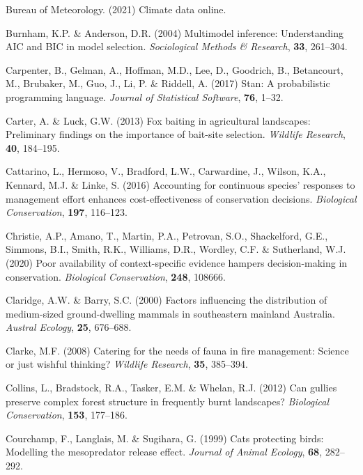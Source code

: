 \documentclass[]{elsarticle} %
\begin{document}
\leavevmode\hypertarget{ref-BOM2021}{}%
Bureau of Meteorology. (2021) Climate data online.

\leavevmode\hypertarget{ref-burnham2004multimodel}{}%
Burnham, K.P. \& Anderson, D.R. (2004) Multimodel inference: Understanding AIC and BIC in model selection. \emph{Sociological Methods \& Research}, \textbf{33}, 261--304.

\leavevmode\hypertarget{ref-carpenter2017stan}{}%
Carpenter, B., Gelman, A., Hoffman, M.D., Lee, D., Goodrich, B., Betancourt, M., Brubaker, M., Guo, J., Li, P. \& Riddell, A. (2017) Stan: A probabilistic programming language. \emph{Journal of Statistical Software}, \textbf{76}, 1--32.

\leavevmode\hypertarget{ref-carter2013fox}{}%
Carter, A. \& Luck, G.W. (2013) Fox baiting in agricultural landscapes: Preliminary findings on the importance of bait-site selection. \emph{Wildlife Research}, \textbf{40}, 184--195.

\leavevmode\hypertarget{ref-cattarino2016accounting}{}%
Cattarino, L., Hermoso, V., Bradford, L.W., Carwardine, J., Wilson, K.A., Kennard, M.J. \& Linke, S. (2016) Accounting for continuous species' responses to management effort enhances cost-effectiveness of conservation decisions. \emph{Biological Conservation}, \textbf{197}, 116--123.

\leavevmode\hypertarget{ref-christie2020poor}{}%
Christie, A.P., Amano, T., Martin, P.A., Petrovan, S.O., Shackelford, G.E., Simmons, B.I., Smith, R.K., Williams, D.R., Wordley, C.F. \& Sutherland, W.J. (2020) Poor availability of context-specific evidence hampers decision-making in conservation. \emph{Biological Conservation}, \textbf{248}, 108666.

\leavevmode\hypertarget{ref-claridge2000factors}{}%
Claridge, A.W. \& Barry, S.C. (2000) Factors influencing the distribution of medium-sized ground-dwelling mammals in southeastern mainland Australia. \emph{Austral Ecology}, \textbf{25}, 676--688.

\leavevmode\hypertarget{ref-clarke2008catering}{}%
Clarke, M.F. (2008) Catering for the needs of fauna in fire management: Science or just wishful thinking? \emph{Wildlife Research}, \textbf{35}, 385--394.

\leavevmode\hypertarget{ref-collins2012can}{}%
Collins, L., Bradstock, R.A., Tasker, E.M. \& Whelan, R.J. (2012) Can gullies preserve complex forest structure in frequently burnt landscapes? \emph{Biological Conservation}, \textbf{153}, 177--186.

\leavevmode\hypertarget{ref-courchamp1999cats}{}%
Courchamp, F., Langlais, M. \& Sugihara, G. (1999) Cats protecting birds: Modelling the mesopredator release effect. \emph{Journal of Animal Ecology}, \textbf{68}, 282--292.
\end{document}
